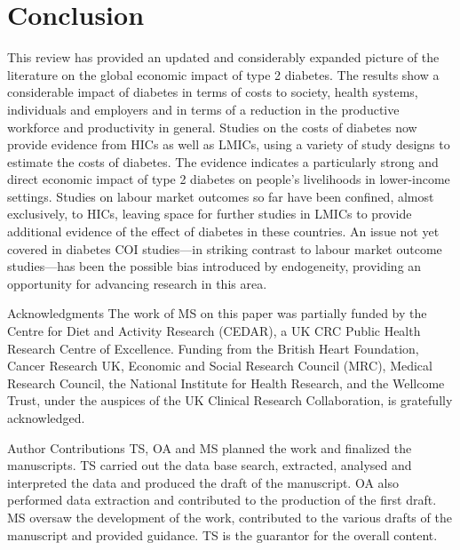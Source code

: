 \documentclass[12pt,english]{article}
\begin{document}
\section{Conclusion}

This review has provided an updated and considerably expanded picture of the literature on the global economic impact of type 2 diabetes. The results show a considerable impact of diabetes in terms of costs to society, health systems, individuals and employers and in terms of a reduction in the productive workforce and productivity in general. Studies on the costs of diabetes now provide evidence from \acp{HIC} as well as \acp{LMIC}, using a variety of study designs to estimate the costs of diabetes. The evidence indicates a particularly strong and direct economic impact of type 2 diabetes on people's livelihoods in lower-income settings. Studies on labour market outcomes so far have been confined, almost exclusively, to \acp{HIC}, leaving space for further studies in \acp{LMIC} to provide additional evidence of the effect of diabetes in these countries. An issue not yet covered in diabetes \ac{COI} studies---in striking contrast to labour market outcome studies---has been the possible bias introduced by endogeneity, providing an opportunity for advancing research in this area. 

Acknowledgments The work of MS on this paper was partially funded by the Centre for Diet and Activity Research (CEDAR), a \ac{UK} CRC Public Health Research Centre of Excellence. Funding from the British Heart Foundation, Cancer Research \ac{UK}, Economic and Social Research Council (MRC), Medical Research Council, the National Institute for Health Research, and the Wellcome Trust, under the auspices of the \ac{UK} Clinical Research Collaboration, is gratefully acknowledged.

Author Contributions TS, OA and MS planned the work and finalized the manuscripts. TS carried out the data base search, extracted, analysed and interpreted the data and produced the draft of the manuscript. OA also performed data extraction and contributed to the production of the first draft. MS oversaw the development of the work, contributed to the various drafts of the manuscript and provided guidance. TS is the guarantor for the overall content.
\end{document}
